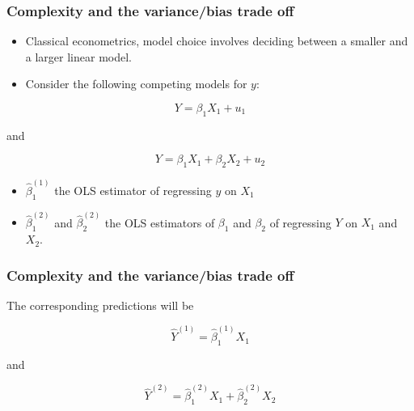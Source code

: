 \documentclass[
  shownotes,
  xcolor={svgnames},
  hyperref={colorlinks,citecolor=DarkBlue,linkcolor=DarkRed,urlcolor=DarkBlue}
  , aspectratio=169]{beamer}
\begin{document}
\begin{frame}
\frametitle{Complexity and the variance/bias trade off}

\begin{itemize}
\item Classical econometrics, model choice involves deciding between a smaller and a larger linear model. 
\item Consider the following competing models for $y$:

\end{itemize}
\bigskip
\begin{equation}
Y=\beta_1 X_1 + u_1
\end{equation}

and

\begin{equation}
Y=\beta_1 X_1 + \beta_2 X_2 + u_2
\end{equation}

\bigskip
\begin{itemize}
  \item $\hat \beta^{(1)}_1$ the OLS estimator of regressing $y$ on $X_1$
  \item  $\hat \beta^{(2)}_1$ and $\hat \beta^{(2)}_2$ the OLS estimators of $\beta_1$ and $\beta_2$ of regressing $Y$ on $X_1$ and $X_2$. 
\end{itemize}
 
\end{frame}

\begin{frame}
\frametitle{Complexity and the variance/bias trade off}

The corresponding predictions will be

\begin{equation}\label{eq:3_2_3}
\hat{Y}^{(1)}=\hat{\beta}^{(1)}_1 X_1 
\end{equation}

and

\begin{equation}\label{eq:3_2_4}
\hat{Y}^{(2)}=\hat{\beta}^{(2)}_1 X_1 + \hat{\beta}^{(2)}_2 X_2 
\end{equation}

\end{frame}
\end{document}
